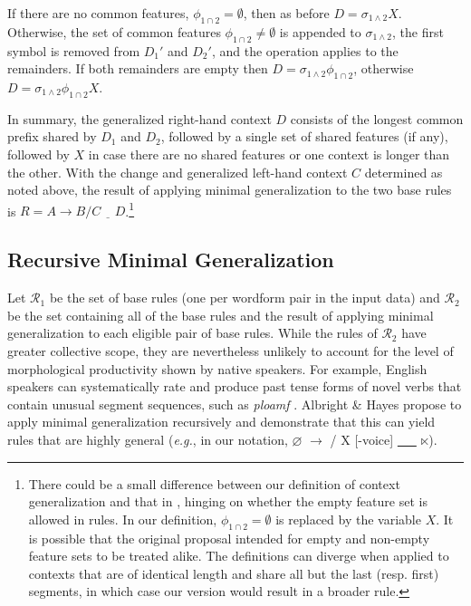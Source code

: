 \documentclass[11pt]{article}
\begin{document}
If there are no common features, $\phi_{1\cap2} = \emptyset$, then as before $D = \sigma_{1\land2}X$. Otherwise, the set of common features $\phi_{1\cap2} \neq \emptyset$ is appended to $\sigma_{1\land2}$, the first symbol is removed from $D_1'$ and $D_2'$, and the operation applies to the remainders. If both remainders are empty then $D = \sigma_{1\land2} \phi_{1\cap2}$, otherwise $D = \sigma_{1\land2}\phi_{1\cap2}X$.

In summary, the generalized right-hand context $D$ consists of the longest common prefix shared by $D_1$ and $D_2$, followed by a single set of shared features (if any), followed by $X$ in case there are no shared features or one context is longer than the other. With the change and generalized left-hand context $C$ determined as noted above, the result of applying minimal generalization to the two base rules is $R = A \to B / C \ \underline{\ \ \ } \ D$.\footnote{There could be a small difference between our definition of context generalization and that in \citet{albright-hayes-2002-modeling}, hinging on whether the empty feature set is allowed in rules. In our definition, $\phi_{1\cap2} = \emptyset$ is replaced by the variable $X$. It is possible that the original proposal intended for empty and non-empty feature sets to be treated alike. The definitions can diverge when applied to contexts that are of identical length and share all but the last (resp. first) segments, in which case our version would result in a broader rule.}

\subsection{Recursive Minimal Generalization}

Let $\mathcal{R}_1$ be the set of base rules (one per wordform pair in the input data) and $\mathcal{R}_2$ be the set containing all of the base rules and the result of applying minimal generalization to each eligible pair of base rules. While the rules of $\mathcal{R}_2$ have greater collective scope, they are nevertheless unlikely to account for the level of morphological productivity shown by native speakers. For example, English speakers can systematically rate and produce past tense forms of novel verbs that contain unusual segment sequences, such as \emph{ploamf}  \citep[\emph{e.g.},][]{prasada1993}. Albright \& Hayes propose to apply minimal generalization recursively and demonstrate that this can yield rules that are highly general (\emph{e.g.}, in our notation, $\varnothing$ $\to$  / X [-voice] \underline{\ \ \ } $\ltimes$).
\end{document}
